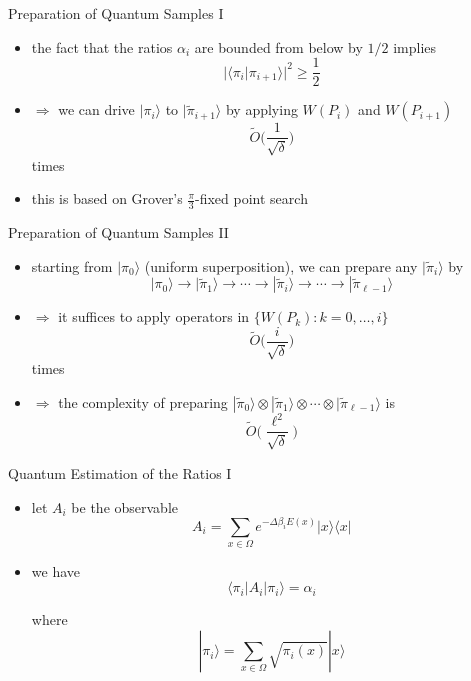 \documentclass[slideColor]{prosper}
\renewcommand{\>}{\rangle}
\newcommand{\<}{\langle}
\begin{document}
\begin{slide}{Preparation of Quantum Samples I}
\begin{itemize}
\item the fact that the ratios $\alpha_i$ are bounded from below by $1/2$ implies 
\[
|\<\pi_i|\pi_{i+1}\>|^2 \ge \frac{1}{2}
\]

\medskip
\item $\Rightarrow$ we can drive $|\pi_i\>$ to $|\tilde{\pi}_{i+1}\>$ by applying $W(P_i)$ and $W(P_{i+1})$
\[
\tilde{O}\Big(\frac{1}{\sqrt{\delta}}\Big)
\] 
times

\medskip
\item this is based on Grover's $\frac{\pi}{3}$-fixed point search

\end{itemize}
\end{slide}


\begin{slide}{Preparation of Quantum Samples II}
\begin{itemize}
\item starting from $|\pi_0\>$ (uniform superposition), we can prepare any $|\tilde{\pi}_i\>$ by
\[
|\pi_0\> \rightarrow |\tilde{\pi}_1\> \rightarrow \cdots \rightarrow |\tilde{\pi}_i\> \rightarrow \cdots \rightarrow |\tilde{\pi}_{\ell-1}\>
\]

\medskip
\item $\Rightarrow$ it suffices to apply operators in $\{W(P_k) : k = 0,\ldots,i\}$
\[
\tilde{O}\Big(\frac{i}{\sqrt{\delta}}\Big)
\]
times

\medskip
\item $\Rightarrow$ the complexity of preparing $|\tilde{\pi}_0\>\otimes |\tilde{\pi}_1\> \otimes \cdots \otimes |\tilde{\pi}_{\ell-1}\>$ is
\[
\tilde{O}\Big(
\frac{\ell^2}{\sqrt{\delta}}
\Big)
\]
\end{itemize}
\end{slide}


\begin{slide}{Quantum Estimation of the Ratios I}
\begin{itemize}
\item let $A_i$ be the observable
\[
A_i = \sum_{x\in\Omega} e^{-\Delta\beta_i E(x)} |x\>\<x|
\]

\medskip
\item we have 
\[
\<\pi_i|A_i|\pi_i\> = \alpha_i
\]

\medskip
where 
\[
|\pi_i\> = \sum_{x\in\Omega} \sqrt{\pi_i(x)} |x\>
\]

\end{itemize}
\end{slide}
\end{document}
